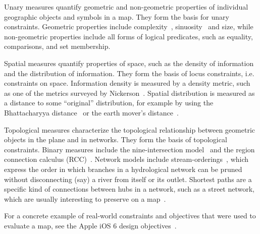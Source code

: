 \documentclass[11pt, oneside]{report}
\begin{document}
{Unary measures quantify geometric and non-geometric properties of individual geographic objects and symbols in a map. They form the basis for unary constraints.  Geometric properties include complexity~\cite{douglas1973algorithms}, sinuosity~\cite{mueller1968introduction} and size, while non-geometric properties include all forms of logical predicates, such as equality, comparisons, and set membership.

Spatial measures quantify properties of space, such as the density of information and the distribution of information. They form the basis of locus constraints, i.e. constraints on space. Information density is measured by a density metric, such as one of the metrics surveyed by Nickerson~\cite{nickerson1994visual}. Spatial distribution is measured as a distance to some ``original'' distribution, for example by using the Bhattacharyya distance~\cite{bhattacharyya1946measure} or the earth mover's distance~\cite{rubner2000earth}.

Topological measures characterize the topological relationship between geometric objects in the plane and in networks. They form the basis of topological constraints. Binary measures include the nine-intersection model~\cite{egenhofer1991categorizing} and the region connection calculus (RCC)~\cite{randell1992spatial}. Network models include stream-orderings~\cite{horton1945erosional,shreve1966statistical,strahler1957quantitative}, which express the order in which branches in a hydrological network can be pruned without disconnecting (say) a river from itself or its outlet. Shortest paths are a specific kind of connections between hubs in a network, such as a street network, which are usually interesting to preserve on a map~\cite{schmid2013opensciencemap}.

For a concrete example of real-world constraints and objectives that were used to evaluate a map, see the Apple iOS 6 design objectives~\cite{samet2012duking}.


}
\end{document}
